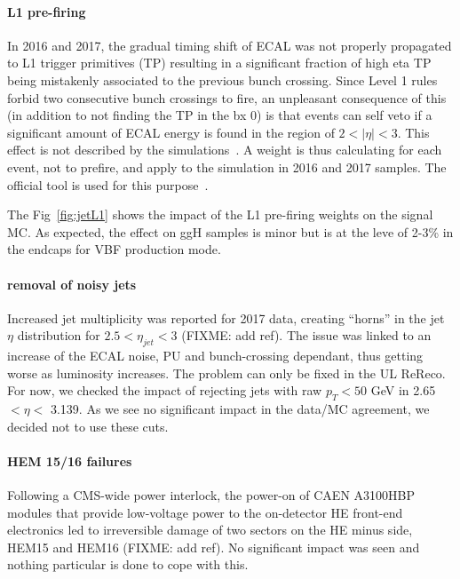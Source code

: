 \paragraph{L1 pre-firing}

In 2016 and 2017, the gradual timing shift of ECAL was not properly propagated to L1 trigger primitives (TP) resulting in a significant fraction of high eta TP being mistakenly associated to the previous bunch crossing. Since Level 1 rules forbid two consecutive bunch crossings to fire, an unpleasant consequence of this (in addition to not finding the TP in the bx 0) is that events can self veto if a significant amount of ECAL energy is found in the region of $2<|\eta|<3$. This effect is not described by the simulations~\cite{L1PrefiringTwiki}. A weight is thus calculating for each event, not to prefire, and apply to the simulation in 2016 and 2017 samples. The official tool is used for this purpose~\cite{L1PrefiringTwiki}.

The Fig~\ref{fig:jetL1} shows the impact of the L1 pre-firing weights on the signal MC. As expected, the effect on ggH samples is minor but is at the leve of 2-3\% in the endcaps for VBF production mode. 

\paragraph{removal of noisy jets}

Increased jet multiplicity was reported for 2017 data, creating ``horns'' in the jet $\eta$ distribution for $2.5<\eta_{jet}<3$ (FIXME: add ref). The issue was linked to an increase of the ECAL noise, PU and bunch-crossing dependant, thus getting worse as luminosity increases. The problem can only be fixed in the UL ReReco. For now, we checked the impact of rejecting jets with raw $p_T<50$ GeV in 2.65 $< \eta <$ 3.139. As we see no significant impact in the data/MC agreement, we decided not to use these cuts.

\paragraph{HEM 15/16 failures}

Following	a CMS-wide power interlock, the power-on of CAEN A3100HBP modules that provide low-voltage power to the on-detector HE front-end electronics led to irreversible damage of two sectors on the HE minus side, HEM15 and HEM16 (FIXME: add ref). No significant impact was seen and nothing particular is done to cope with this. 

